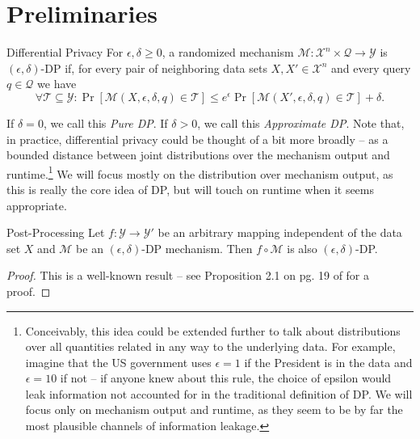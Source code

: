 \documentclass[11pt]{scrartcl} %
\begin{document}
\section{Preliminaries}
\begin{definition}
	\label{defn:differential_privacy}
	Differential Privacy \cite{DMNS06} \newline
	For $\epsilon, \delta \geq 0$, a randomized mechanism
	$\mathcal{M}: \mathcal{X}^n \times \mathcal{Q} \rightarrow \mathcal{Y}$ is
	$(\epsilon, \delta)$-DP if, for every pair of neighboring data sets $X, X' \in \mathcal{X}^n$ and
	every query $q \in \mathcal{Q}$ we have
	\[ \forall \mathcal{T} \subseteq \mathcal{Y}: \Pr[\mathcal{M}(X, \epsilon, \delta, q) \in \mathcal{T}] \leq e^{\epsilon} \Pr[\mathcal{M}(X', \epsilon, \delta, q) \in \mathcal{T}] + \delta. \]
\end{definition}
If $\delta = 0$, we call this \emph{Pure DP}. If $\delta > 0$, we call this \emph{Approximate DP}.
Note that, in practice, differential privacy could be thought of a bit more broadly -- as a bounded
distance between joint distributions over the mechanism output and runtime.\footnote{Conceivably, this idea
could be extended further to talk about distributions over all quantities related in any way to the underlying data.
For example, imagine that the US government uses $\epsilon = 1$ if the President is in the data and $\epsilon = 10$
if not -- if anyone knew about this rule, the choice of epsilon would leak information not accounted for in the
traditional definition of DP.
We will focus only on mechanism output and runtime, as they seem to be by far the most plausible
channels of information leakage.} We will focus mostly on the distribution over mechanism output, as this
is really the core idea of DP, but will touch on runtime when it seems appropriate.

\begin{theorem}
	\label{thm:post_processing}
	Post-Processing \newline
	Let $f: \mathcal{Y} \rightarrow \mathcal{Y}'$ be an arbitrary mapping independent
	of the data set $X$ and
	$\mathcal{M}$ be an $(\epsilon, \delta)$-DP mechanism.
	Then $f \circ \mathcal{M}$ is also $(\epsilon, \delta)$-DP.

	\begin{proof}
		This is a well-known result -- see Proposition 2.1 on pg. 19 of \cite{DR14} for a proof.
	\end{proof}
\end{theorem}
\end{document}
